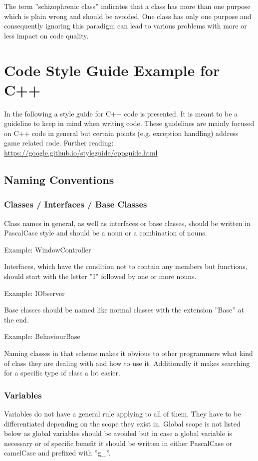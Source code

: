 The term ''schizophrenic class'' indicates that a class has more than one purpose which is plain wrong and should be avoided. One class has only one purpose and consequently ignoring this paradigm can lead to various problems with more or less impact on code quality.

\section{Code Style Guide Example for C++}
In the following a style guide for C++ code is presented. It is meant to be a guideline to keep in mind when writing code. These guidelines are mainly focused on C++ code in general but certain points (e.g. exception handling) address game related code. Further reading: \url{https://google.github.io/styleguide/cppguide.html}

\subsection{Naming Conventions}
\subsubsection{Classes / Interfaces / Base Classes}
Class names in general, as well as interfaces or base classes, should be written in PascalCase style and should be a noun or a combination of nouns.

Example: WindowController

Interfaces, which have the condition not to contain any members but functions, should start with the letter ''I'' followed by one or more nouns.

Example: IObserver

Base classes should be named like normal classes with the extension ''Base'' at the end.

Example: BehaviourBase

Naming classes in that scheme makes it obvious to other programmers what kind of class they are dealing with and how to use it. Additionally it makes searching for a specific type of class a lot easier.

\subsubsection{Variables}
Variables do not have a general rule applying to all of them. They have to be differentiated depending on the scope they exist in. Global scope is not listed below as global variables should be avoided but in case a global variable is necessary or of specific benefit it should be written in either PascalCase or camelCase and prefixed with ''g\_''.

